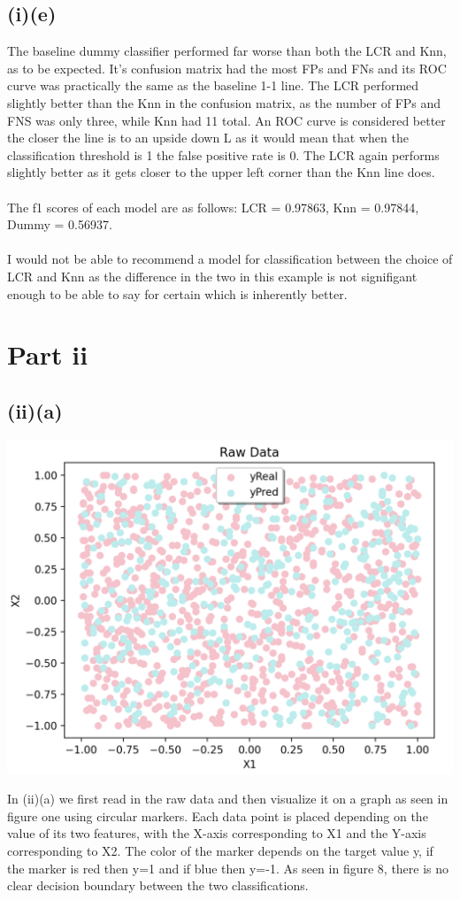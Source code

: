 \documentclass{article}
\begin{document}
\subsection{(i)(e)}
The baseline dummy classifier performed far worse than both the LCR and Knn, as to be expected. It's confusion matrix had the most FPs and FNs and its ROC curve was practically the same as the baseline 1-1 line. The LCR performed slightly better than the Knn in the confusion matrix, as the number of FPs and FNS was only three, while Knn had 11 total. An ROC curve is considered better the closer the line is to an upside down L as it would mean that when the classification threshold is 1 the false positive rate is 0. The LCR again performs slightly better as it gets closer to the upper left corner than the Knn line does.
\\
\\
The f1 scores of each model are as follows: LCR = 0.97863, Knn = 0.97844, Dummy = 0.56937.
\\
\\
I would not be able to recommend a model for classification between the choice of LCR and Knn as the difference in the two in this example is not signifigant enough to be able to say for certain which is inherently better. 

\section{Part ii }
\subsection{(ii)(a)}
\begin{center}
\includegraphics[width=.6\linewidth]{data2.png}
\end{center}

In (ii)(a) we first read in the raw data and then visualize it on a graph as seen in figure one using circular markers. Each data point is placed depending on the value of its two features, with the X-axis corresponding to X1 and the Y-axis corresponding to X2. The color of the marker depends on the target value y, if the marker is red then y=1 and if blue then y=-1. As seen in figure 8, there is no clear decision boundary between the two classifications.
\end{document}
